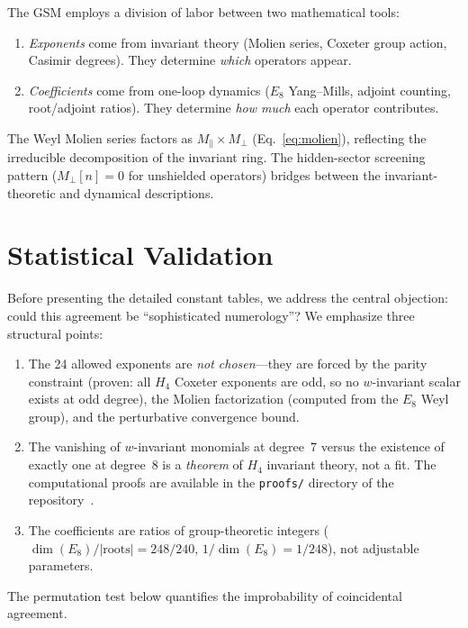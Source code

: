 \documentclass[aps,prd,twocolumn,superscriptaddress,nofootinbib,showpacs]{revtex4-2}
\begin{document}
The GSM employs a division of labor between two mathematical tools:
\begin{enumerate}
\item \emph{Exponents} come from invariant theory (Molien series,
Coxeter group action, Casimir degrees).  They determine \emph{which}
operators appear.
\item \emph{Coefficients} come from one-loop dynamics ($E_8$
Yang--Mills, adjoint counting, root/adjoint ratios).  They determine
\emph{how much} each operator contributes.
\end{enumerate}

The Weyl Molien series factors as $M_\parallel \times M_\perp$
(Eq.~\ref{eq:molien}), reflecting the irreducible decomposition of the
invariant ring.  The hidden-sector screening pattern ($M_\perp[n] = 0$
for unshielded operators) bridges between the invariant-theoretic and
dynamical descriptions.

\section{Statistical Validation}\label{sec:statistics}

Before presenting the detailed constant tables, we address the central
objection: could this agreement be ``sophisticated numerology''?  We
emphasize three structural points:
\begin{enumerate}
\item The 24 allowed exponents are \emph{not chosen}---they are forced
by the parity constraint (proven: all $H_4$ Coxeter exponents are odd,
so no $w$-invariant scalar exists at odd degree), the Molien
factorization (computed from the $E_8$ Weyl group), and the
perturbative convergence bound.
\item The vanishing of $w$-invariant monomials at degree~7 versus the
existence of exactly one at degree~8 is a \emph{theorem} of $H_4$
invariant theory, not a fit.  The computational proofs are available
in the \texttt{proofs/} directory of the repository~\cite{GSMrepo}.
\item The coefficients are ratios of group-theoretic integers
($\dim(E_8)/|\text{roots}| = 248/240$, $1/\dim(E_8) = 1/248$), not
adjustable parameters.
\end{enumerate}
The permutation test below quantifies the improbability of
coincidental agreement.
\end{document}
